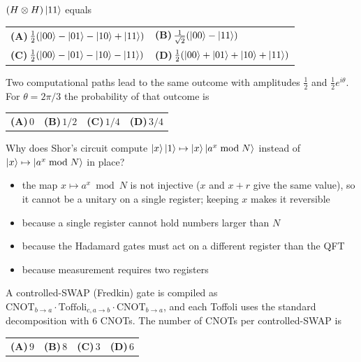 \documentclass[11pt,a4paper]{article}
\newcommand{\optlabel}[1]{\textbf{(#1)}}
\newenvironment{qitem}[1]{\begin{list}{}{\setlength{\leftmargin}{3.3em}\setlength{\labelwidth}{3.1em}%
  \setlength{\labelsep}{0.2em}\setlength{\topsep}{3pt}\setlength{\parsep}{3pt}}\item[\textbf{Q.#1}\hfill]}{\end{list}}
\newcommand{\qsep}{\par\vspace{2pt}{\color{black!15}\hrule}\vspace{4pt}}
\begin{document}
\begin{qitem}{28}
$(H\otimes H)\ket{11}$ equals
\par\smallskip\noindent\begin{tabularx}{\linewidth}{@{}*{2}{L}@{}}
\optlabel{A}\,$\frac12(\ket{00} - \ket{01} - \ket{10} + \ket{11})$ & \optlabel{B}\,$\frac{1}{\sqrt2}(\ket{00} - \ket{11})$ \\[3pt]
\optlabel{C}\,$\frac12(\ket{00} - \ket{01} - \ket{10} - \ket{11})$ & \optlabel{D}\,$\frac12(\ket{00} + \ket{01} + \ket{10} + \ket{11})$
\end{tabularx}
\end{qitem}
\qsep

\begin{qitem}{29}
Two computational paths lead to the same outcome with amplitudes $\frac12$ and $\frac12e^{i\theta}$. For $\theta = 2\pi/3$ the probability of that outcome is
\par\smallskip\noindent\begin{tabularx}{\linewidth}{@{}*{4}{L}@{}}
\optlabel{A}\,$0$ & \optlabel{B}\,$1/2$ & \optlabel{C}\,$1/4$ & \optlabel{D}\,$3/4$
\end{tabularx}
\end{qitem}
\qsep

\begin{qitem}{30}
Why does Shor's circuit compute $\ket x\ket1 \mapsto \ket x\ket{a^x \bmod N}$ instead of $\ket x \mapsto \ket{a^x \bmod N}$ in place?
\begin{itemize}[leftmargin=2.6em, labelsep=0.4em, itemsep=2pt, topsep=3pt]
\item[\optlabel{A}] the map $x \mapsto a^x \bmod N$ is not injective ($x$ and $x + r$ give the same value), so it cannot be a unitary on a single register; keeping $x$ makes it reversible
\item[\optlabel{B}] because a single register cannot hold numbers larger than $N$
\item[\optlabel{C}] because the Hadamard gates must act on a different register than the QFT
\item[\optlabel{D}] because measurement requires two registers
\end{itemize}
\end{qitem}
\qsep

\begin{qitem}{31}
A controlled-SWAP (Fredkin) gate is compiled as $\mathrm{CNOT}_{b\to a}\cdot\mathrm{Toffoli}_{c,a\to b}\cdot\mathrm{CNOT}_{b\to a}$, and each Toffoli uses the
standard decomposition with 6 CNOTs. The number of CNOTs per controlled-SWAP is
\par\smallskip\noindent\begin{tabularx}{\linewidth}{@{}*{4}{L}@{}}
\optlabel{A}\,$9$ & \optlabel{B}\,$8$ & \optlabel{C}\,$3$ & \optlabel{D}\,$6$
\end{tabularx}
\end{qitem}
\qsep
\end{document}
